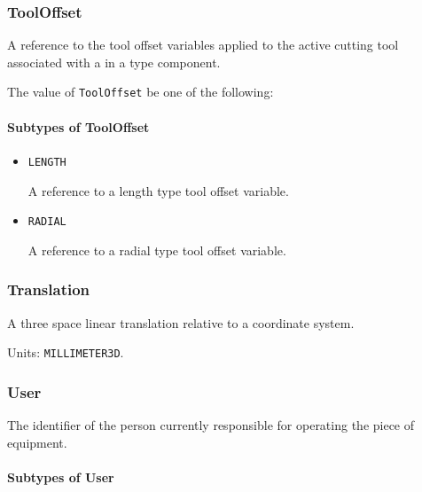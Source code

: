 \subsubsection{ToolOffset}
\label{sec:ToolOffset}



A reference to the tool offset variables applied to the active cutting tool associated with a  in a  type component.


The value of \texttt{ToolOffset} \MUST be one of the following: 

\FloatBarrier

\paragraph{Subtypes of ToolOffset}\mbox{}
\label{sec:Subtypes of ToolOffset}

\begin{itemize}

\item \texttt{LENGTH}


A reference to a length type tool offset variable.

\item \texttt{RADIAL}


A reference to a radial type tool offset variable.


\end{itemize}

\subsubsection{Translation}




A three space linear translation relative to a coordinate system.



Units: \texttt{MILLIMETER\textunderscore 3D}.

\subsubsection{User}
\label{sec:User}



The identifier of the person currently responsible for operating the piece of equipment.


\paragraph{Subtypes of User}\mbox{}
\label{sec:Subtypes of User}

